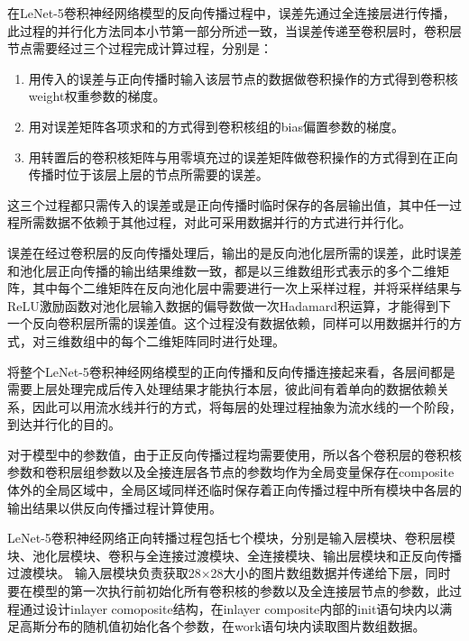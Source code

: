 在LeNet-5卷积神经网络模型的反向传播过程中，误差先通过全连接层进行传播，此过程的并行化方法同本小节第一部分所述一致，当误差传递至卷积层时，卷积层节点需要经过三个过程完成计算过程，分别是： 
\begin{enumerate}
\item 用传入的误差与正向传播时输入该层节点的数据做卷积操作的方式得到卷积核weight权重参数的梯度。
\item 用对误差矩阵各项求和的方式得到卷积核组的bias偏置参数的梯度。
\item 用转置后的卷积核矩阵与用零填充过的误差矩阵做卷积操作的方式得到在正向传播时位于该层上层的节点所需要的误差。
\end{enumerate}
这三个过程都只需传入的误差或是正向传播时临时保存的各层输出值，其中任一过程所需数据不依赖于其他过程，对此可采用数据并行的方式进行并行化。

误差在经过卷积层的反向传播处理后，输出的是反向池化层所需的误差，此时误差和池化层正向传播的输出结果维数一致，都是以三维数组形式表示的多个二维矩阵，其中每个二维矩阵在反向池化层中需要进行一次上采样过程，并将采样结果与ReLU激励函数对池化层输入数据的偏导数做一次Hadamard积运算，才能得到下一个反向卷积层所需的误差值。这个过程没有数据依赖，同样可以用数据并行的方式，对三维数组中的每个二维矩阵同时进行处理。

将整个LeNet-5卷积神经网络模型的正向传播和反向传播连接起来看，各层间都是需要上层处理完成后传入处理结果才能执行本层，彼此间有着单向的数据依赖关系，因此可以用流水线并行的方式，将每层的处理过程抽象为流水线的一个阶段，到达并行化的目的。

对于模型中的参数值，由于正反向传播过程均需要使用，所以各个卷积层的卷积核参数和卷积层组参数以及全接连层各节点的参数均作为全局变量保存在composite体外的全局区域中，全局区域同样还临时保存着正向传播过程中所有模块中各层的输出结果以供反向传播过程计算使用。

LeNet-5卷积神经网络正向转播过程包括七个模块，分别是输入层模块、卷积层模块、池化层模块、卷积与全连接过渡模块、全连接模块、输出层模块和正反向传播过渡模块。
输入层模块负责获取28×28大小的图片数组数据并传递给下层，同时要在模型的第一次执行前初始化所有卷积核的参数以及全连接层节点的参数，此过程通过设计inlayer comoposite结构，在inlayer composite内部的init语句块内以满足高斯分布的随机值初始化各个参数，在work语句块内读取图片数组数据。

